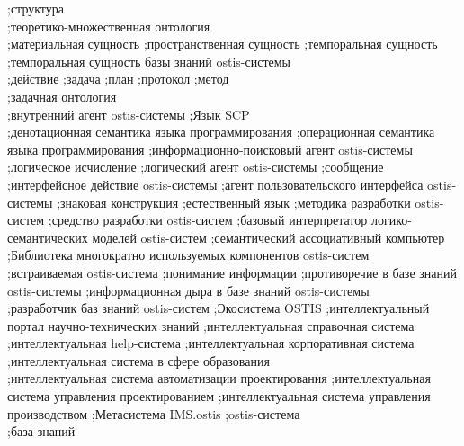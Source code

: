 {;структура\\
;теоретико-множественная онтология\\
;материальная сущность
;пространственная сущность
;темпоральная сущность\\
;темпоральная сущность базы знаний ostis-системы\\
;действие
;задача
;план
;протокол
;метод\\
;задачная онтология\\
;внутренний агент ostis-системы
;Язык SCP\\
;денотационная семантика языка программирования
;операционная семантика языка программирования
;информационно-поисковый агент ostis-системы
;логическое исчисление
;логический агент ostis-системы
;сообщение
;интерфейсное действие ostis-системы
;агент пользовательского интерфейса ostis-системы
;знаковая конструкция
;естественный язык
;методика разработки ostis-систем
;средство разработки ostis-систем
;базовый интерпретатор логико-семантических моделей ostis-систем
;семантический ассоциативный компьютер
;Библиотека многократно используемых компонентов ostis-систем\\
;встраиваемая ostis-система
;понимание информации
;противоречие в базе знаний ostis-системы
;информационная дыра в базе знаний ostis-системы\\
;разработчик баз знаний ostis-систем
;Экосистема OSTIS
;интеллектуальный портал научно-технических знаний
;интеллектуальная справочная система
;интеллектуальная help-система
;интеллектуальная корпоративная система
;интеллектуальная система в сфере образования\\
;интеллектуальная система автоматизации проектирования
;интеллектуальная система управления проектированием
;интеллектуальная система управления производством
;Метасистема IMS.ostis
;ostis-система\\
;база знаний
}